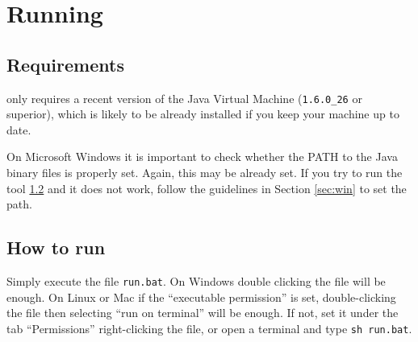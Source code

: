 \chapter{Running}






\section{Requirements}\label{sec:requirements}

\PET only requires a recent version of the Java Virtual Machine (\verb!1.6.0_26! or superior), which is likely to be already installed if you keep your machine up to date. 


On Microsoft Windows it is important to check whether the PATH to the Java binary files is properly set. Again, this may be already set. If you try to run the tool \ref{sec:run} and it does not work, follow the guidelines in Section \ref{sec:win} to set the path.


\section{How to run}\label{sec:run}

Simply execute the file {\tt run.bat}.
On Windows double clicking the file will be enough.
On Linux or Mac if the ``executable permission'' is set, double-clicking the file then selecting ``run on terminal'' will be enough. If not, set it under the tab ``Permissions'' right-clicking the file, or open a terminal and type {\tt sh run.bat}.



